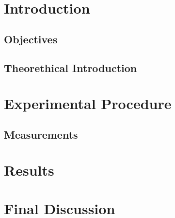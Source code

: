 \documentclass[a4paper,12pt]{article}
\begin{document}
\title{}
\author{}
\date{}
\maketitle
\pagebreak 

\section{Introduction}

\subsection{Objectives}

\subsection{Theorethical Introduction}

\section{Experimental Procedure}

\subsection{Measurements}

\section{Results}

\section{Final Discussion}
\end{document}
